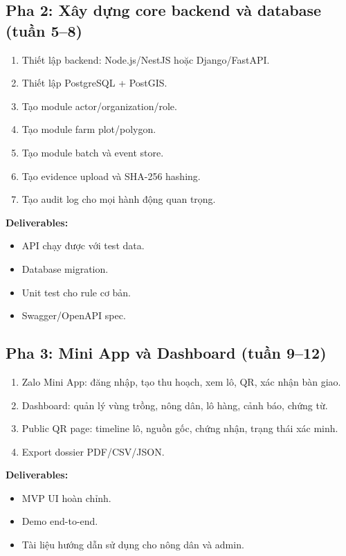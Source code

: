 \documentclass[12pt,a4paper]{article}
\begin{document}
\subsection{Pha 2: Xây dựng core backend và database (tuần 5--8)}

\begin{enumerate}[leftmargin=2em]
    \item Thiết lập backend: Node.js/NestJS hoặc Django/FastAPI.
    \item Thiết lập PostgreSQL + PostGIS.
    \item Tạo module actor/organization/role.
    \item Tạo module farm plot/polygon.
    \item Tạo module batch và event store.
    \item Tạo evidence upload và SHA-256 hashing.
    \item Tạo audit log cho mọi hành động quan trọng.
\end{enumerate}

\textbf{Deliverables:}
\begin{itemize}[leftmargin=2em]
    \item API chạy được với test data.
    \item Database migration.
    \item Unit test cho rule cơ bản.
    \item Swagger/OpenAPI spec.
\end{itemize}

\subsection{Pha 3: Mini App và Dashboard (tuần 9--12)}

\begin{enumerate}[leftmargin=2em]
    \item Zalo Mini App: đăng nhập, tạo thu hoạch, xem lô, QR, xác nhận bàn giao.
    \item Dashboard: quản lý vùng trồng, nông dân, lô hàng, cảnh báo, chứng từ.
    \item Public QR page: timeline lô, nguồn gốc, chứng nhận, trạng thái xác minh.
    \item Export dossier PDF/CSV/JSON.
\end{enumerate}

\textbf{Deliverables:}
\begin{itemize}[leftmargin=2em]
    \item MVP UI hoàn chỉnh.
    \item Demo end-to-end.
    \item Tài liệu hướng dẫn sử dụng cho nông dân và admin.
\end{itemize}
\end{document}
